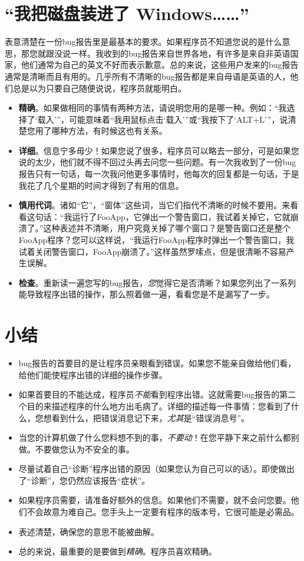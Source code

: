 \documentclass[titlepage]{article}
\begin{document}
\section{{“我把磁盘装进了 Windows……”}}

表意清楚在一份bug报告里是最基本的要求。如果程序员不知道您说的是什么意思，那您就跟没说一样。我收到的bug报告来自世界各地，有许多是来自非英语国家，他们通常为自己的英文不好而表示歉意。总的来说，这些用户发来的bug报告通常是清晰而且有用的。几乎所有不清晰的bug报告都是来自母语是英语的人，他们总是以为只要自己随便说说，程序员就能明白。
\begin{itemize}
	\item \textbf{精确}。如果做相同的事情有两种方法，请说明您用的是哪一种。例如：“我选择了‘载入’”，可能意味着“我用鼠标点击‘载入’”或“我按下了‘ALT+L’”，说清楚您用了哪种方法，有时候这也有关系。
	\item \textbf{详细}。信息宁多毋少！如果您说了很多，程序员可以略去一部分，可是如果您说的太少，他们就不得不回过头再去问您一些问题。有一次我收到了一份bug报告只有一句话，每一次我问他更多事情时，他每次的回复都是一句话，于是我花了几个星期的时间才得到了有用的信息。
	\item \textbf{慎用代词}。诸如“它”，“窗体”这些词，当它们指代不清晰的时候不要用。来看看这句话：“我运行了FooApp，它弹出一个警告窗口，我试着关掉它，它就崩溃了。”这种表述并不清晰，用户究竟关掉了哪个窗口？是警告窗口还是整个FooApp程序？您可以这样说，“我运行FooApp程序时弹出一个警告窗口，我试着关闭警告窗口，FooApp崩溃了。”这样虽然罗嗦点，但是很清晰不容易产生误解。
	\item \textbf{检查}。重新读一遍您写的bug报告，\emph{您}觉得它是否清晰？如果您列出了一系列能导致程序出错的操作，那么照着做一遍，看看您是不是漏写了一步。
\end{itemize}

\section{{小结}}
\begin{itemize}
	\item bug报告的首要目的是让程序员亲眼看到错误。如果您不能亲自做给他们看，给他们能使程序出错的详细的操作步骤。
	\item 如果首要目的不能达成，程序员\emph{不能}看到程序出错。这就需要bug报告的第二个目的来描述程序的什么地方出毛病了。详细的描述每一件事情：您看到了什么，您想看到什么，把错误消息记下来，\emph{尤其}是“错误消息号”。
	\item 当您的计算机做了什么您料想不到的事，\emph{不要动}！在您平静下来之前什么都别做。不要做您认为不安全的事。
	\item 尽量试着自己“诊断”程序出错的原因（如果您认为自己可以的话）。即使做出了“诊断”，您仍然应该报告“症状”。
	\item 如果程序员需要，请准备好额外的信息。如果他们不需要，就不会问您要。他们不会故意为难自己。您手头上一定要有程序的版本号，它很可能是必需品。
	\item 表述清楚，确保您的意思不能被曲解。
	\item 总的来说，最重要的是要做到\emph{精确}。程序员喜欢精确。
\end{itemize}
\end{document}

